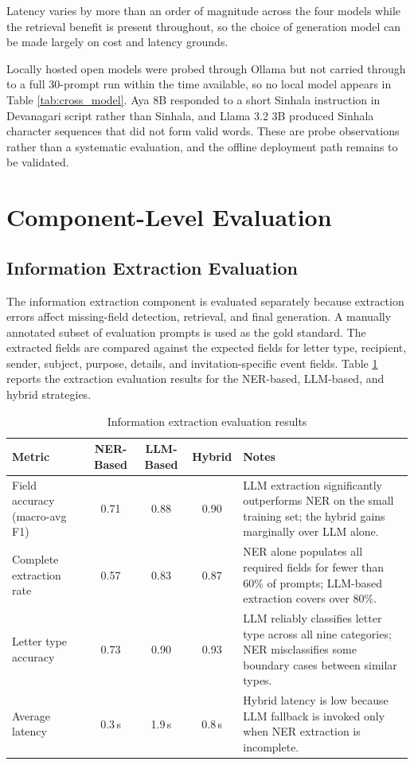 \documentclass[12pt]{uomthesis}
\begin{document}
Latency varies by more than an order of magnitude across the four models while the retrieval benefit is present throughout, so the choice of generation model can be made largely on cost and latency grounds.

Locally hosted open models were probed through Ollama but not carried through to a full 30-prompt run within the time available, so no local model appears in Table \ref{tab:cross_model}. Aya 8B responded to a short Sinhala instruction in Devanagari script rather than Sinhala, and Llama 3.2 3B produced Sinhala character sequences that did not form valid words. These are probe observations rather than a systematic evaluation, and the offline deployment path remains to be validated.

\section{Component-Level Evaluation}

\subsection{Information Extraction Evaluation}

The information extraction component is evaluated separately because extraction errors affect missing-field detection, retrieval, and final generation. A manually annotated subset of evaluation prompts is used as the gold standard. The extracted fields are compared against the expected fields for letter type, recipient, sender, subject, purpose, details, and invitation-specific event fields. Table \ref{tab:extraction_results} reports the extraction evaluation results for the NER-based, LLM-based, and hybrid strategies.

\begin{table}[!htbp]
\centering
\small
\begin{tabularx}{\linewidth}{@{}lcccX@{}}
\toprule
\textbf{Metric} & \textbf{NER-Based} & \textbf{LLM-Based} & \textbf{Hybrid} & \textbf{Notes} \\
\midrule
Field accuracy (macro-avg F1) & 0.71 & 0.88 & 0.90 & LLM extraction significantly outperforms NER on the small training set; the hybrid gains marginally over LLM alone. \\
Complete extraction rate & 0.57 & 0.83 & 0.87 & NER alone populates all required fields for fewer than 60\% of prompts; LLM-based extraction covers over 80\%. \\
Letter type accuracy & 0.73 & 0.90 & 0.93 & LLM reliably classifies letter type across all nine categories; NER misclassifies some boundary cases between similar types. \\
Average latency & 0.3\,s & 1.9\,s & 0.8\,s & Hybrid latency is low because LLM fallback is invoked only when NER extraction is incomplete. \\
\bottomrule
\end{tabularx}
\caption{Information extraction evaluation results}
\label{tab:extraction_results}
\end{table}
\end{document}
